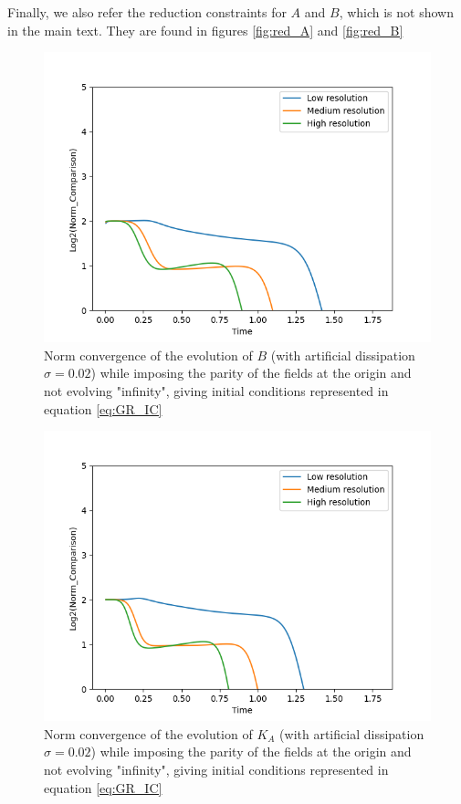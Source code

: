 Finally, we also refer the reduction constraints for $A$ and $B$, which is not shown in the main text. They are found in figures \ref{fig:red_A} and \ref{fig:red_B}

\begin{figure}[H]
    \centering
    \includegraphics[width=0.9\columnwidth]{Images/B-norm.png}
    \caption{Norm convergence of the evolution of $B$ (with artificial dissipation $\sigma = 0.02$) while imposing the parity of the fields at the origin and not evolving "infinity", giving initial conditions represented in equation \ref{eq:GR_IC}}
    \label{fig:norm_B}
\end{figure}

\newpage

\begin{figure}[H]
    \centering
    \includegraphics[width=0.9\columnwidth]{Images/KA-norm.png}
    \caption{Norm convergence of the evolution of $K_A$ (with artificial dissipation $\sigma = 0.02$) while imposing the parity of the fields at the origin and not evolving "infinity", giving initial conditions represented in equation \ref{eq:GR_IC}}
    \label{fig:norm_KA}
\end{figure}

